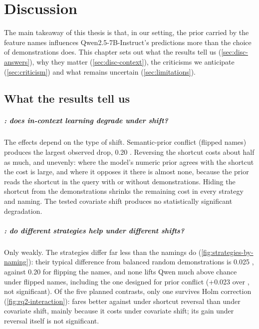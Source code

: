 \chapter{Discussion}
\label{ch:discussion}

The main takeaway of this thesis is that, in our setting, the prior carried by the feature names influences Qwen2.5-7B-Instruct's predictions more than the choice of demonstrations does. This chapter sets out what the results tell us (\autoref{sec:disc-answers}), why they matter (\autoref{sec:disc-context}), the criticisms we anticipate (\autoref{sec:criticism}) and what remains uncertain (\autoref{sec:limitations}).

\section{What the results tell us}
\label{sec:disc-answers}

\paragraph{: does in-context learning degrade under shift?}
The effects depend on the type of shift. Semantic-prior conflict (flipped names) produces the largest observed drop, 0.20 \AUROC. Reversing the shortcut costs about half as much, and unevenly: where the model's numeric prior agrees with the shortcut the cost is large, and where it opposes it there is almost none, because the prior reads the shortcut in the query with or without demonstrations. Hiding the shortcut from the demonstrations shrinks the remaining cost in every strategy and naming. The tested covariate shift produces no statistically significant degradation.

\paragraph{: do different strategies help under different shifts?}
Only weakly. The strategies differ far less than the namings do (\autoref{fig:strategies-by-naming}): their typical difference from balanced random demonstrations is 0.025 \AUROC, against 0.20 for flipping the names, and none lifts Qwen much above chance under flipped names, including the one designed for prior conflict (+0.023 over , not significant). Of the five planned  contrasts, only one survives Holm correction (\autoref{fig:rq2-interaction}):  fares better against  under shortcut reversal than under covariate shift, mainly because it costs \AUROC under covariate shift; its gain under reversal itself is not significant.

